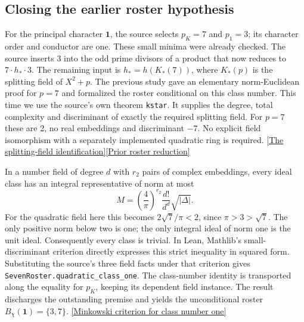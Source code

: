 \documentclass[12pt,letterpaper]{article}
\begin{document}
\subsection{Closing the earlier roster hypothesis}
For the principal character \(\mathbf1\), the source selects \(p_K=7\) and \(p_1=3\); its character order and conductor are one. These small minima were already checked. The source inserts 3 into the odd prime divisors of a product that now reduces to \(7\cdot h_*\cdot3\). The remaining input is \(h_*=h(K_*(7))\), where \(K_*(p)\) is the splitting field of \(X^2+p\). The previous study gave an elementary norm-Euclidean proof for \(p=7\) and formalized the roster conditional on this class number. This time we use the source's own theorem \texttt{kstar}. It supplies the degree, total complexity and discriminant of exactly the required splitting field. For \(p=7\) these are 2, no real embeddings and discriminant \(-7\). No explicit field isomorphism with a separately implemented quadratic ring is required. \href{https://github.com/nousentllc/riemann-hypothesis/blob/40e56bab026552e089d7afcfeff08d2defb9c005/src/Development/AutomorphicArithmetic/AutomorphicVarieties/HeightAndVanishing/SplittingFieldIsoQuadratic.lean#L50-L67}{[The splitting-field identification]}\quad\href{https://github.com/nousentllc/riemann-hypothesis/blob/0b9ed6f42cccf214e7e196f2e129ea1e3b1b5987/research/uriel/experiments/prescribed-gap-witnesses/evidence/roster/FixedRoster.lean}{[Prior roster reduction]}

In a number field of degree \(d\) with \(r_2\) pairs of complex embeddings, every ideal class has an integral representative of norm at most
\[
    M=\left(\frac4\pi\right)^{r_2}\frac{d!}{d^d}\sqrt{|\Delta|}.
\]
For the quadratic field here this becomes \(2\sqrt7/\pi<2\), since \(\pi>3>\sqrt7\). The only positive norm below two is one; the only integral ideal of norm one is the unit ideal. Consequently every class is trivial. In Lean, Mathlib's small-discriminant criterion directly expresses this strict inequality in squared form. Substituting the source's three field facts under that criterion gives \texttt{SevenRoster.quadratic\_class\_one}. The class-number identity is transported along the equality for \(p_K\), keeping its dependent field instance. The result discharges the outstanding premise and yields the unconditional roster \(B_\chi(\mathbf1)=\{3,7\}\). \href{https://github.com/leanprover-community/mathlib4/blob/0df444a360eaa60ab8c11dca51a86af692955474/Mathlib/NumberTheory/NumberField/ClassNumber.lean}{[Minkowski criterion for class number one]}
\end{document}

